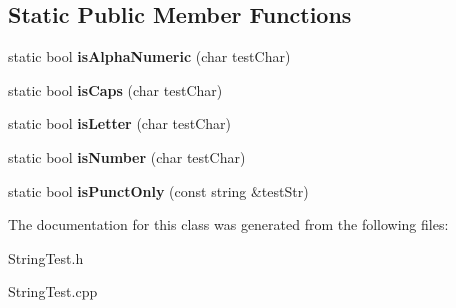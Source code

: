 \subsection*{Static Public Member Functions}
\begin{DoxyCompactItemize}
\item 
\mbox{\label{class_string_test_a44ac5993b0c1ea98d15f38eb2d0c3f2c}} 
static bool {\bfseries is\+Alpha\+Numeric} (char test\+Char)
\item 
\mbox{\label{class_string_test_a3365c939189eed0e5704f5bb996c210c}} 
static bool {\bfseries is\+Caps} (char test\+Char)
\item 
\mbox{\label{class_string_test_ab45bcefb58a346873155a7f2d2c68314}} 
static bool {\bfseries is\+Letter} (char test\+Char)
\item 
\mbox{\label{class_string_test_a0c6db9235f2864d4bfb0eb48b1acbbce}} 
static bool {\bfseries is\+Number} (char test\+Char)
\item 
\mbox{\label{class_string_test_a3cf3206ed4ccc71107ba2c613a458c9b}} 
static bool {\bfseries is\+Punct\+Only} (const string \&test\+Str)
\end{DoxyCompactItemize}


The documentation for this class was generated from the following files\+:\begin{DoxyCompactItemize}
\item 
String\+Test.\+h\item 
String\+Test.\+cpp\end{DoxyCompactItemize}
